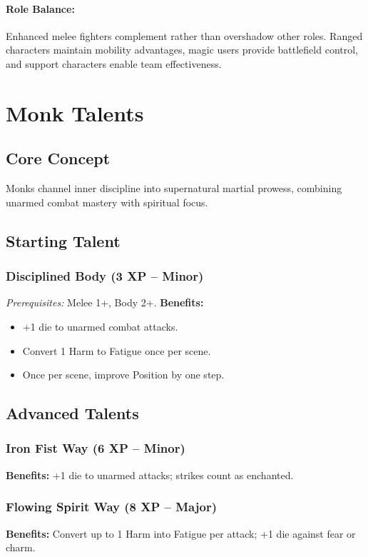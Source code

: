 \paragraph{Role Balance:}
Enhanced melee fighters complement rather than overshadow other roles. Ranged characters maintain mobility advantages, magic users provide battlefield control, and support characters enable team effectiveness.

\section{Monk Talents}\label{sec:monk_talents}

\subsection{Core Concept}
Monks channel inner discipline into supernatural martial prowess, combining unarmed combat mastery with spiritual focus.

\subsection{Starting Talent}
\subsubsection{Disciplined Body (3 XP -- Minor)}\label{talent:disciplined_body}
\textit{Prerequisites:} Melee 1+, Body 2+.
\textbf{Benefits:}
\begin{itemize}
    \item +1 die to unarmed combat attacks.
    \item Convert 1 Harm to Fatigue once per scene.
    \item Once per scene, improve Position by one step.
\end{itemize}

\subsection{Advanced Talents}
\subsubsection{Iron Fist Way (6 XP -- Minor)}\label{talent:iron_fist_way}
\textbf{Benefits:} +1 die to unarmed attacks; strikes count as enchanted.

\subsubsection{Flowing Spirit Way (8 XP -- Major)}\label{talent:flowing_spirit_way}
\textbf{Benefits:} Convert up to 1 Harm into Fatigue per attack; +1 die against fear or charm.

